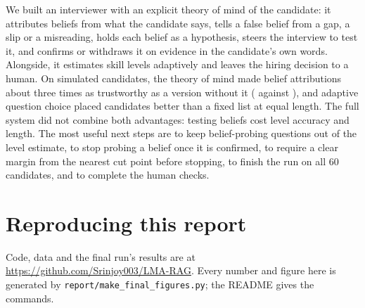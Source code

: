 \documentclass[10pt,a4paper]{article}
\begin{document}
We built an interviewer with an explicit theory of mind of the candidate: it attributes beliefs from
what the candidate says, tells a false belief from a gap, a slip or a misreading, holds each belief as
a hypothesis, steers the interview to test it, and confirms or withdraws it on evidence in the
candidate's own words. Alongside, it estimates skill levels adaptively and leaves the hiring decision
to a human. On \fN{} simulated candidates, the theory of mind made belief attributions about three
times as trustworthy as a version without it (\fPrecisionFull{} against \fPrecisionAfour{}), and
adaptive question choice placed candidates better than a fixed list at equal length. The full system
did not combine both advantages: testing beliefs cost level accuracy and length. The most useful next steps are to keep
belief-probing questions out of the level estimate, to stop probing a belief once it is confirmed, to
require a clear margin from the nearest cut point before stopping, to finish the run on all 60
candidates, and to complete the human checks.

\section*{Reproducing this report}
\begingroup\sloppy
Code, data and the final run's results are at \url{https://github.com/Srinjoy003/LMA-RAG}. Every number
and figure here is generated by \texttt{report/make\_final\_figures.py}; the README gives the commands.
\par\endgroup
\end{document}
